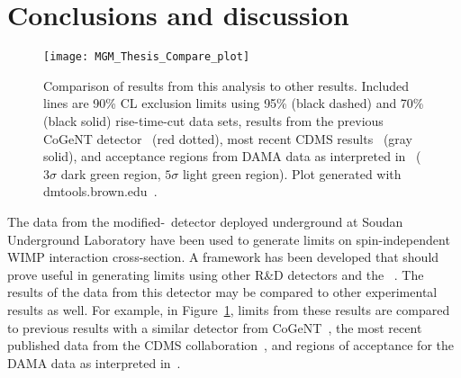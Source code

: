 	\section{Conclusions and discussion}
	\label{sec:LowMassWIMPConclusions}


		\begin{figure}
			\centering
			\texttt{[image: MGM\_Thesis\_Compare\_plot]}
			\caption[Comparison of exclusions to CDMS, DAMA, and previous CoGeNT results.]
			{Comparison of results from this analysis to other results.  Included lines are 90\% CL 
			exclusion limits using 95\% (black dashed) and 70\% (black solid) rise-time-cut data sets, 
			results from the previous CoGeNT detector~\cite{Aalseth:2008aa} (red dotted), 
			most recent CDMS results~\cite{Ahmed:2009zw} (gray solid), and acceptance regions
			from DAMA data as interpreted in~\cite{Savage:2008er} ($3\sigma$ dark green region,
			$5\sigma$ light green region).  Plot generated with dmtools.brown.edu~\cite{Gai03}.}
			\label{fig:BeGeLimitsComparedToOtherDataSets}
		\end{figure}		

The data from the modified-\bege~detector deployed underground at Soudan Underground Laboratory have been used to generate limits on spin-independent WIMP interaction cross-section.  A framework has been developed that should prove useful in generating limits using other R\&D detectors and the \MJ~\minmod.  The results of the data from this detector may be compared to other experimental results as well.  For example, in Figure~\ref{fig:BeGeLimitsComparedToOtherDataSets}, limits from these results are compared to previous results with a similar detector from CoGeNT~\cite{Aalseth:2008aa}, the most recent published data from the CDMS collaboration~\cite{Ahmed:2009zw}, and regions of acceptance for the DAMA data as interpreted in~\cite{Savage:2008er}.  


